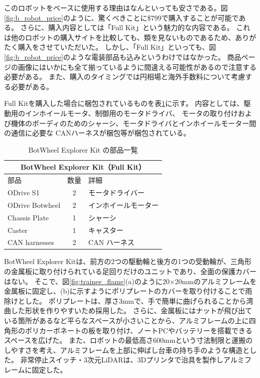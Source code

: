 \documentclass[twocolumn,9pt]{jsproceedings}
\begin{document}
このロボットをベースに使用する理由はなんといっても安さである。図\ref{fig:b_robot_price}のように、驚くべきことに\$799で購入することが可能である。
さらに、購入内容としては「Full Kit」という魅力的な内容である。
これは他のロボットの購入サイトを比較しても、類を見ないものであるため、ありがたく購入をさせていただいた。
しかし、「Full Kit」といっても、図\ref{fig:b_robot_price}のような電装部品も込みというわけではなかった。
商品ページの画像にはいかにも全て揃っているように間違える可能性があるので注意する必要がある。
また、購入のタイミングでは円相場と海外手数料について考慮する必要がある。

Full Kitを購入した場合に梱包されているものを表\ref{tab:botwheel_kit}に示す。
内容としては、駆動用のインホイールモータ、制御用のモータドライバ、
モータの取り付けおよび機体のボーディのためのシャーシ、モータドライバとインホイールモーター間の通信に必要な
CANハーネスが梱包等が梱包されている。
\begin{table}[h]
  \centering
  \begin{tabular}{|l|c|l|}
      \hline
      \multicolumn{3}{|c|}{\textbf{BotWheel Explorer Kit（Full Kit）}} \\
      \hline
      部品 & 数量 & 詳細 \\
      \hline
      ODrive S1 & 2 & モータドライバー \\
      ODrive Botwheel & 2 & インホイールモーター \\
      Chassis Plate & 1 & シャーシ \\
      Caster & 1 & キャスター \\
      CAN harnesses & 2 & CAN ハーネス \\
      \hline
  \end{tabular}
  \caption{BotWheel Explorer Kit の部品一覧}
  \label{tab:botwheel_kit}
\end{table}


BotWheel Explorer Kitは、前方の2つの駆動輪と後方の1つの受動輪が、三角形の金属板に取り付けられている足回りだけのユニットであり、全面の保護カバーはない。
そこで、図\ref{fig:trainee_flame}(a)のように20×20mmのアルミフレームを金属板に固定し、(b)に示すようにポリプレートのカバーを取り付けることで雨除けとした。
ポリプレートは、厚さ3mmで、手で簡単に曲げられることから湾曲した形状を作りやすいため採用した。
さらに、金属板にはナットが飛び出ている箇所があるなど平らなスペースが小さいことから、アルミフレームの上に四角形のポリカーボネート\cite{PE960_1}の板を取り付け、ノートPCやバッテリーを搭載できるスペースを広げた。
また、ロボットの最低高さ600mmという寸法制限と運搬のしやすさを考え、アルミフレームを上部に伸ばし台車の持ち手のような構造とした。
非常停止スイッチ・3次元LiDARは、3Dプリンタで治具を製作しアルミフレームに固定した。
\end{document}
